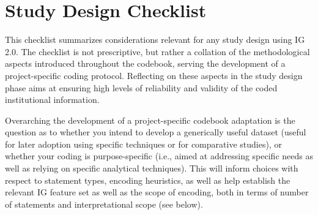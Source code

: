 \section{Study Design Checklist}
\label{sec:Checklist}

This checklist summarizes considerations relevant for any study design using IG 2.0. The checklist is not prescriptive, but rather a collation of the methodological aspects introduced throughout the codebook, serving the development of a project-specific coding protocol. Reflecting on these aspects in the study design phase aims at ensuring high levels of reliability and validity of the coded institutional information. 

Overarching the development of a project-specific codebook adaptation is the question as to whether you intend to develop a generically useful dataset (useful for later adoption using specific techniques or for comparative studies), or whether your coding is purpose-specific (i.e., aimed at addressing specific needs as well as relying on specific analytical techniques). This will inform choices with respect to statement types, encoding heuristics, as well as help establish the relevant IG feature set as well as the scope of encoding, both in terms of number of statements and interpretational scope (see below).

